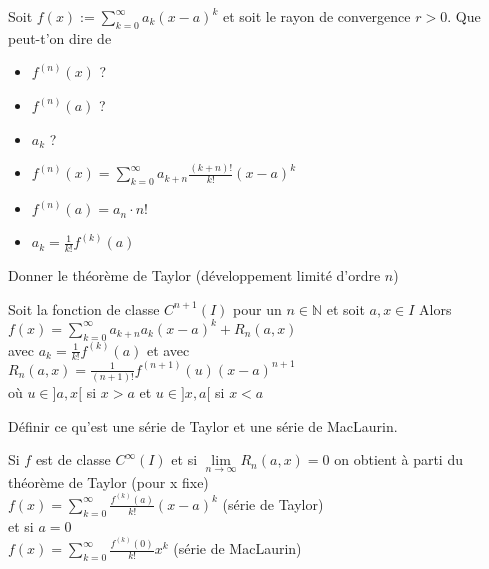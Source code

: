 \documentclass[12pt]{article}
\newcommand*{\xfield}[1]{\begin{mdframed}\centering #1\end{mdframed}\bigskip}
\newenvironment{note}{}{}
\begin{document}
\begin{note}
	\xfield{Soit $f(x) :=  \sum\limits^{\infty}_{k=0}a_k (x-a)^k$ et soit le rayon de convergence $r > 0$. Que peut-t'on dire de
	\begin{itemize}
		\item $f^{(n)}(x)$ ?
		\item $f^{(n)}(a)$ ?
		\item $a_k$ ?
	\end{itemize}}
	\xfield{\begin{itemize}
		\item $f^{(n)}(x) =  \sum\limits^{\infty}_{k=0} a_{k+n} \frac{(k+n)!}{k!} (x-a)^k$
		\item $f^{(n)}(a) = a_n \cdot n!$
		\item $a_k = \frac{1}{k!} f^{(k)}(a)$
	\end{itemize} }
\end{note}

\begin{note}
	\xfield{Donner le théorème de Taylor (développement limité d'ordre $n$)}
	\xfield{Soit la fonction de classe $C^{n+1}(I)$ pour un $n \in \mathbb{N}$ et soit $a,x \in I$ Alors\\
	$f(x) = \sum\limits^{\infty}_{k=0} a_{k+n} a_k (x-a)^k + R_n(a,x)$\\
	avec $a_k = \frac{1}{k!} f^{(k)}(a)$ et avec\\
	$R_n(a,x) = \frac{1}{(n+1)!} f^{(n+1)}(u) (x-a)^{n+1}$\\
	où $u \in ]a,x[$ si $x>a$ et $u \in ]x,a[$ si $x<a$}
\end{note}

\begin{note}
	\xfield{Définir ce qu'est une série de Taylor et une série de MacLaurin.}
	\xfield{Si $f$ est de classe $C^{\infty}(I)$ et si $\lim\limits_{n \to \infty} R_n(a,x)=0$ on obtient à parti du théorème de Taylor (pour x fixe)\\
	$f(x) = \sum\limits^{\infty}_{k=0} \frac{f^{(k)}(a)}{k!}(x-a)^k$ (série de Taylor)\\
	et si $a=0$\\
	$f(x) = \sum\limits^{\infty}_{k=0} \frac{f^{(k)}(0)}{k!}x^k$ (série de MacLaurin)}
\end{note}
\end{document}
